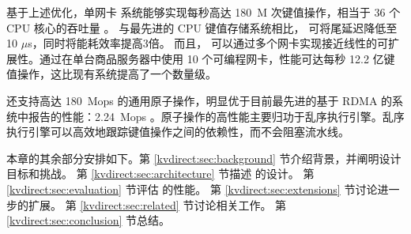 基于上述优化，单网卡 \oursys{} 系统能够实现每秒高达 180~M 次键值操作，相当于 36 个 CPU 核心的吞吐量 \cite {li2016full}。
与最先进的 CPU 键值存储系统相比，\oursys{} 可将尾延迟降低至 10 $\mu$s，同时将能耗效率提高3倍。
而且，\oursys{} 可以通过多个网卡实现接近线性的可扩展性。通过在单台商品服务器中使用 10 个可编程网卡，性能可达每秒 12.2 亿键值操作，这比现有系统提高了一个数量级。

\oursys{} 还支持高达 180~Mops 的通用原子操作，明显优于目前最先进的基于 RDMA 的系统中报告的性能：2.24~Mops \cite {kalia2014using}。原子操作的高性能主要归功于乱序执行引擎。乱序执行引擎可以高效地跟踪键值操作之间的依赖性，而不会阻塞流水线。

本章的其余部分安排如下。第 \ref {kvdirect:sec:background} 节介绍背景，并阐明设计目标和挑战。
第 \ref {kvdirect:sec:architecture} 节描述 \oursys{} 的设计。
第 \ref {kvdirect:sec:evaluation} 节评估 \oursys{} 的性能。
第 \ref {kvdirect:sec:extensions} 节讨论进一步的扩展。
第 \ref {kvdirect:sec:related} 节讨论相关工作。
第 \ref {kvdirect:sec:conclusion} 节总结。
